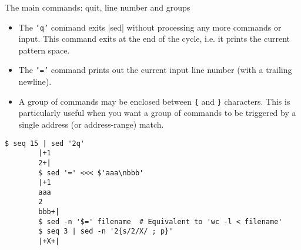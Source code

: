 \begin{frame}[fragile]{The main commands: quit, line number and groups}
    \vspace{-3mm}
    \begin{itemize}
        \item The \texttt{'q'} command exits \bash|sed| without processing any more commands or input.
              This command exits at the end of the cycle, i.e. it prints the current pattern space.
        \item The \texttt{'='} command prints out the current input line number (with a trailing newline).
        \item A group of commands may be enclosed between \texttt{\{} and \texttt{\}} characters.
              This is particularly useful when you want a group of commands to be triggered by a single address (or address-range) match. 
    \end{itemize}
    \begin{lstlisting}[style=MyBash]
        $ seq 15 | sed '2q'
        |+1
        2+|
        $ sed '=' <<< $'aaa\nbbb'
        |+1
        aaa
        2
        bbb+|
        $ sed -n '$=' filename  # Equivalent to 'wc -l < filename'
        $ seq 3 | sed -n '2{s/2/X/ ; p}'
        |+X+|
    \end{lstlisting}
\end{frame}




